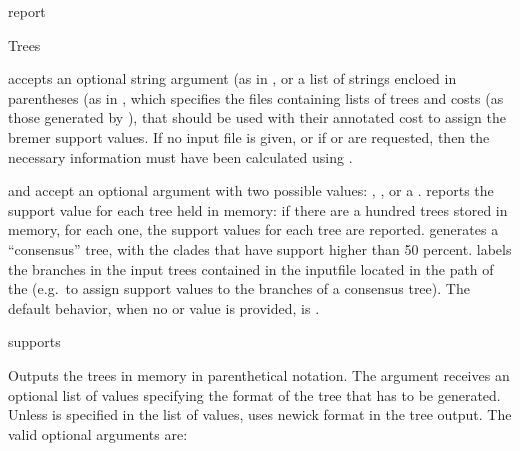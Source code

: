 \begin{command}{report}{}
\begin{arguments}
\begin{argumentgroup}{Trees}
{                 accepts an optional string argument
                (as in , 
                or a list of strings encloed in parentheses (as in
                , which specifies the files containing lists of trees and costs (as
                those generated by ), that should be used with
                their annotated cost to assign the bremer support values. 
                If no input file is given, or if  or
                 are requested,
                then the necessary information must have been calculated 
                using .
                
                 and  accept an
                optional argument with two possible values:
                , , or a
                \poystring.
                reports the support value for each tree held in memory: if there
                are a hundred trees stored in memory, for each one, the support
                values for each tree are reported. 
                generates a ``consensus'' tree, with the clades that have
                support higher than 50 percent. \poystring labels the branches
                in the input trees contained in the inputfile located in the path of
                the \poystring (e.g.\ to assign support values to the branches of a consensus
                tree). The default behavior, when no
                 or  value is
                provided, is .}
                {supports}

                {Outputs the trees in memory in parenthetical notation. The argument
                 receives an optional list of values
                specifying the format of the tree that has to be generated.
                Unless  is specified in the list of values, 
                 uses newick format in the tree output. The
                valid optional arguments are:  
                
}
\end{argumentgroup}
\end{arguments}
\end{command}
